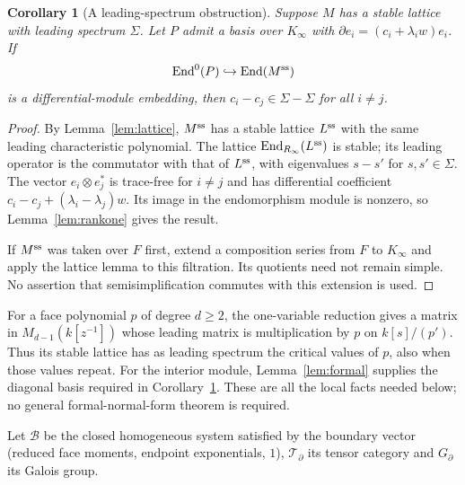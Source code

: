 \documentclass[11pt]{article}
\numberwithin{equation}{section}
\newtheorem{corollary}[corollary]{Corollary}
\theoremstyle{definition}
\theoremstyle{remark}
\newcommand{\End}{\operatorname{End}}
\newcommand{\Tcal}{\mathcal T}
\newcommand{\Bcal}{\mathcal B}
\begin{document}
\begin{corollary}[A leading-spectrum obstruction]\label{cor:face-lattice}
Suppose $M$ has a stable lattice with leading spectrum $\Sigma$. Let $P$
admit a basis over $K_\infty$ with
$\partial e_i=(c_i+\lambda_iw)e_i$. If
\[
 \End^0(P)\hookrightarrow\End(M^{\rm ss})
\]
is a differential-module embedding, then $c_i-c_j\in\Sigma-\Sigma$ for
all $i\ne j$.
\end{corollary}
\begin{proof}
By Lemma~\ref{lem:lattice}, $M^{\rm ss}$ has a stable lattice $L^{\rm ss}$
with the same leading characteristic polynomial. The lattice
$\End_{R_\infty}(L^{\rm ss})$ is stable; its leading operator is the
commutator with that of $L^{\rm ss}$, with eigenvalues $s-s'$ for
$s,s'\in\Sigma$. The vector $e_i\otimes e_j^*$ is trace-free for $i\ne j$
and has differential coefficient
$c_i-c_j+(\lambda_i-\lambda_j)w$. Its image in the endomorphism module is
nonzero, so Lemma~\ref{lem:rankone} gives the result.

If $M^{\rm ss}$ was taken over $F$ first, extend a composition series from
$F$ to $K_\infty$ and apply the lattice lemma to this filtration. Its
quotients need not remain simple. No assertion that semisimplification
commutes with this extension is used.
\end{proof}

For a face polynomial $p$ of degree $d\ge2$, the one-variable reduction gives
a matrix in $M_{d-1}(k[z^{-1}])$ whose leading matrix is multiplication by
$p$ on $k[s]/(p')$. Thus its stable lattice has as leading spectrum the
critical values of $p$, also when those values repeat. For the interior
module, Lemma~\ref{lem:formal} supplies the diagonal basis required in
Corollary~\ref{cor:face-lattice}. These are all the local facts needed below;
no general formal-normal-form theorem is required.

Let $\Bcal$ be the closed homogeneous system satisfied by the boundary vector
(reduced face moments, endpoint exponentials, $1$), $\Tcal_\partial$ its tensor
category and $G_\partial$ its Galois group.
\end{document}
